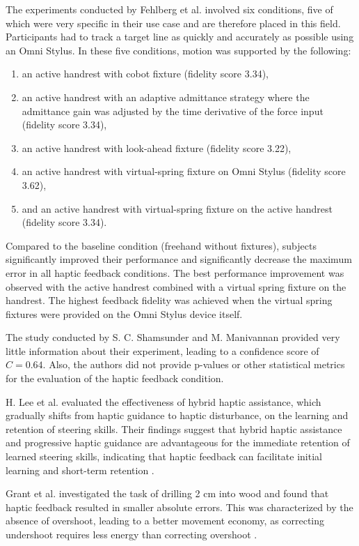 The experiments conducted by Fehlberg et al. involved six conditions, five of which were very specific in their use case and are therefore placed in this field. Participants had to track a target line as quickly and accurately as possible using an Omni Stylus. In these five conditions, motion was supported by the following:
\begin{enumerate}
    \item an active handrest with cobot fixture (fidelity score 3.34),
    \item an active handrest with an adaptive admittance strategy where the admittance gain was adjusted by the time derivative of the force input (fidelity score 3.34),
    \item an active handrest with look-ahead fixture (fidelity score 3.22),
    \item an active handrest with virtual-spring fixture on Omni Stylus (fidelity score 3.62),
    \item and an active handrest with virtual-spring fixture on the active handrest (fidelity score 3.34).
\end{enumerate}
Compared to the baseline condition (freehand without fixtures), subjects significantly improved their performance and significantly decrease the maximum error in all haptic feedback conditions. The best performance improvement was observed with the active handrest combined with a virtual spring fixture on the handrest. The highest feedback fidelity was achieved when the virtual spring fixtures were provided on the Omni Stylus device itself. 

The study conducted by S. C. Shamsunder and M. Manivannan provided very little information about their experiment, leading to a confidence score of $C = 0.64$. Also, the authors did not provide p-values or other statistical metrics for the evaluation of the haptic feedback condition.

H. Lee et al. evaluated the effectiveness of hybrid haptic assistance, which gradually shifts from haptic guidance to haptic disturbance, on the learning and retention of steering skills. Their findings suggest that hybrid haptic assistance and progressive haptic guidance are advantageous for the immediate retention of learned steering skills, indicating that haptic feedback can facilitate initial learning and short-term retention \cite{LeeH2014}. 

Grant et al. \cite{Grant2019} investigated the task of drilling 2 cm into wood and found that haptic feedback resulted in smaller absolute errors. This was characterized by the absence of overshoot, leading to a better movement economy, as correcting undershoot requires less energy than correcting overshoot \cite{Grant2019}.



